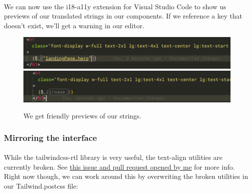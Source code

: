 \documentclass{report}
\begin{document}
\paragraph{}
We can now use the i18-a11y extension for Visual Studio Code to show us previews of our translated strings in our components. If we reference a key that doesn't exist, we'll get a warning in our editor.

\begin{figure}[H]
  \includegraphics[width=\linewidth]{./media/development/frontend/localisation/no_ext.png}
  \includegraphics[width=\linewidth]{./media/development/frontend/localisation/with_ext.png}
  \label{fig:localisation1}
  \caption{We get friendly previews of our strings.}
\end{figure}

\subsubsection{Mirroring the interface}
\paragraph{}
While the tailwindcss-rtl library is very useful, the text-align utilities are currently broken. See \href{https://github.com/20lives/tailwindcss-rtl/issues/39}{this issue and pull request opened by me} for more info. Right now though, we can work around this by overwriting the broken utilities in our Tailwind.postcss file:
\end{document}
